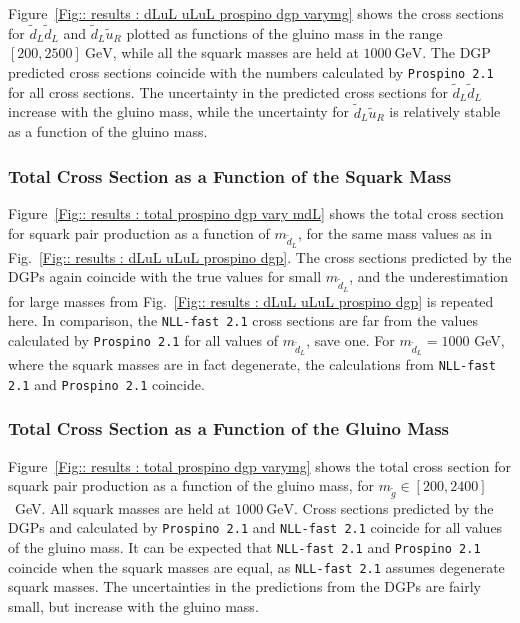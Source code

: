 \documentclass[twoside,english]{uiofysmaster}
\begin{document}
{{Figure~\ref{Fig:: results : dLuL uLuL prospino dgp varymg} shows the cross sections for $\widetilde{d}_L \widetilde{d}_L$ and $\widetilde{d}_L \widetilde{u}_R$ plotted as functions of the gluino mass in the range $[200, 2500]~\mathrm{GeV}$, while all the squark masses are held at $1000~\mathrm{GeV}$. The DGP predicted cross sections coincide with the numbers calculated by \verb|Prospino 2.1| for all cross sections. The uncertainty in the predicted cross sections for $\widetilde{d}_L \widetilde{d}_L$ increase with the gluino mass, while the uncertainty for $\widetilde{d}_L \widetilde{u}_R$ is relatively stable as a function of the gluino mass.  

\subsubsection{Total Cross Section as a Function of the Squark Mass}

Figure~\ref{Fig:: results : total prospino dgp vary mdL} shows the total cross section for squark pair production as a function of $m_{\widetilde{d}_L}$, for the same mass values as in Fig.~\ref{Fig:: results : dLuL uLuL prospino dgp}. The cross sections predicted by the DGPs again coincide with the true values for small $m_{\widetilde{d}_L}$, and the underestimation for large masses from Fig.~\ref{Fig:: results : dLuL uLuL prospino dgp} is repeated here. In comparison, the \verb|NLL-fast 2.1| cross sections are far from the values calculated by \verb|Prospino 2.1| for all values of $m_{\widetilde{d}_L}$, save one. For $m_{\widetilde{d}_L}=1000$ GeV, where the squark masses are in fact degenerate, the calculations from \verb|NLL-fast 2.1| and \verb|Prospino 2.1| coincide.  

\subsubsection{Total Cross Section as a Function of the Gluino Mass}

Figure~\ref{Fig:: results : total prospino dgp varymg} shows the total cross section for squark pair production as a function of the gluino mass, for $m_{\widetilde{g}} \in [200, 2400]$~GeV. All squark masses are held at $1000~\mathrm{GeV}$. Cross sections predicted by the DGPs and calculated by \verb|Prospino 2.1| and \verb|NLL-fast 2.1| coincide for all values of the gluino mass. It can be expected that \verb|NLL-fast 2.1| and \verb|Prospino 2.1| coincide when the squark masses are equal, as \verb|NLL-fast 2.1| assumes degenerate squark masses. The uncertainties in the predictions from the DGPs are fairly small, but increase with the gluino mass. 




}}
\end{document}
